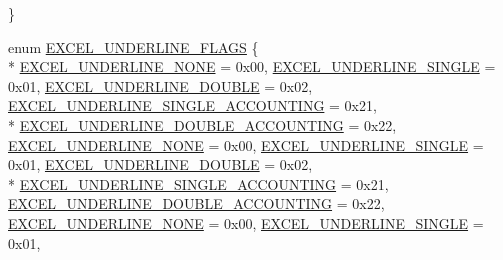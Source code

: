 \begin{DoxyCompactItemize}
 \}
\item 
enum \hyperlink{namespace_excel_format_a24c0e7797c103f21f016a661ee583267}{E\+X\+C\+E\+L\+\_\+\+U\+N\+D\+E\+R\+L\+I\+N\+E\+\_\+\+F\+L\+A\+G\+S} \{ \\*
\hyperlink{namespace_excel_format_a24c0e7797c103f21f016a661ee583267a126cfb122221b71de89717a09ab87b34}{E\+X\+C\+E\+L\+\_\+\+U\+N\+D\+E\+R\+L\+I\+N\+E\+\_\+\+N\+O\+N\+E} = 0x00, 
\hyperlink{namespace_excel_format_a24c0e7797c103f21f016a661ee583267a331baf4c4baa50b52edffcee528974c6}{E\+X\+C\+E\+L\+\_\+\+U\+N\+D\+E\+R\+L\+I\+N\+E\+\_\+\+S\+I\+N\+G\+L\+E} = 0x01, 
\hyperlink{namespace_excel_format_a24c0e7797c103f21f016a661ee583267aa35a908773eb55b7ccb2a49ee5ffa16e}{E\+X\+C\+E\+L\+\_\+\+U\+N\+D\+E\+R\+L\+I\+N\+E\+\_\+\+D\+O\+U\+B\+L\+E} = 0x02, 
\hyperlink{namespace_excel_format_a24c0e7797c103f21f016a661ee583267afff01cd731b0f2bf2c912fd0a81b94cf}{E\+X\+C\+E\+L\+\_\+\+U\+N\+D\+E\+R\+L\+I\+N\+E\+\_\+\+S\+I\+N\+G\+L\+E\+\_\+\+A\+C\+C\+O\+U\+N\+T\+I\+N\+G} = 0x21, 
\\*
\hyperlink{namespace_excel_format_a24c0e7797c103f21f016a661ee583267aa8fd5f992f62a78173f580ee6903acc5}{E\+X\+C\+E\+L\+\_\+\+U\+N\+D\+E\+R\+L\+I\+N\+E\+\_\+\+D\+O\+U\+B\+L\+E\+\_\+\+A\+C\+C\+O\+U\+N\+T\+I\+N\+G} = 0x22, 
\hyperlink{namespace_excel_format_a24c0e7797c103f21f016a661ee583267a126cfb122221b71de89717a09ab87b34}{E\+X\+C\+E\+L\+\_\+\+U\+N\+D\+E\+R\+L\+I\+N\+E\+\_\+\+N\+O\+N\+E} = 0x00, 
\hyperlink{namespace_excel_format_a24c0e7797c103f21f016a661ee583267a331baf4c4baa50b52edffcee528974c6}{E\+X\+C\+E\+L\+\_\+\+U\+N\+D\+E\+R\+L\+I\+N\+E\+\_\+\+S\+I\+N\+G\+L\+E} = 0x01, 
\hyperlink{namespace_excel_format_a24c0e7797c103f21f016a661ee583267aa35a908773eb55b7ccb2a49ee5ffa16e}{E\+X\+C\+E\+L\+\_\+\+U\+N\+D\+E\+R\+L\+I\+N\+E\+\_\+\+D\+O\+U\+B\+L\+E} = 0x02, 
\\*
\hyperlink{namespace_excel_format_a24c0e7797c103f21f016a661ee583267afff01cd731b0f2bf2c912fd0a81b94cf}{E\+X\+C\+E\+L\+\_\+\+U\+N\+D\+E\+R\+L\+I\+N\+E\+\_\+\+S\+I\+N\+G\+L\+E\+\_\+\+A\+C\+C\+O\+U\+N\+T\+I\+N\+G} = 0x21, 
\hyperlink{namespace_excel_format_a24c0e7797c103f21f016a661ee583267aa8fd5f992f62a78173f580ee6903acc5}{E\+X\+C\+E\+L\+\_\+\+U\+N\+D\+E\+R\+L\+I\+N\+E\+\_\+\+D\+O\+U\+B\+L\+E\+\_\+\+A\+C\+C\+O\+U\+N\+T\+I\+N\+G} = 0x22, 
\hyperlink{namespace_excel_format_a24c0e7797c103f21f016a661ee583267a126cfb122221b71de89717a09ab87b34}{E\+X\+C\+E\+L\+\_\+\+U\+N\+D\+E\+R\+L\+I\+N\+E\+\_\+\+N\+O\+N\+E} = 0x00, 
\hyperlink{namespace_excel_format_a24c0e7797c103f21f016a661ee583267a331baf4c4baa50b52edffcee528974c6}{E\+X\+C\+E\+L\+\_\+\+U\+N\+D\+E\+R\+L\+I\+N\+E\+\_\+\+S\+I\+N\+G\+L\+E} = 0x01, 

\end{DoxyCompactItemize}

